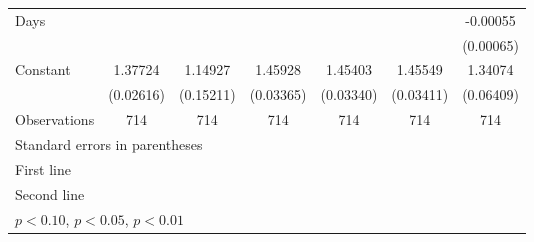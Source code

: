 \begin{table}[htbp]
\begin{tabular}{l*{6}{c}}
\addlinespace
Days                &                     &                     &                     &                     &                     &    -0.00055         \\
                    &                     &                     &                     &                     &                     &   (0.00065)         \\
\addlinespace
Constant            &     1.37724\sym{***}&     1.14927\sym{***}&     1.45928\sym{***}&     1.45403\sym{***}&     1.45549\sym{***}&     1.34074\sym{***}\\
                    &   (0.02616)         &   (0.15211)         &   (0.03365)         &   (0.03340)         &   (0.03411)         &   (0.06409)         \\
\midrule
Observations        &         714         &         714         &         714         &         714         &         714         &         714         \\
\bottomrule
\multicolumn{7}{l}{\footnotesize Standard errors in parentheses}\\
\multicolumn{7}{l}{\footnotesize First line}\\
\multicolumn{7}{l}{\footnotesize Second line}\\
\multicolumn{7}{l}{\footnotesize \sym{*} \(p<0.10\), \sym{**} \(p<0.05\), \sym{***} \(p<0.01\)}\\
\end{tabular}
\end{table}
